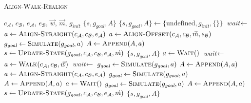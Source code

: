 \begin{algorithm}
	\caption{\scshape Align-Walk-Realign}
	\label{algo:local_algo}
	\begin{algorithmic}[1]
		\REQUIRE $c_\mathcal{A}$, $c_\mathcal{B}$, $e_\mathcal{A}$, $e_\mathcal{B}$, $\vec{w}$, $\vec{m}$, $g_\textit{init}$ 
		\ENSURE $\{s, g_\textit{goal}, A\}$ 
		\STATE $\{s, g_\textit{goal}, A\} \gets \{\text{undefined}, g_\textit{init}, \{\}\}$
		\STATE $\textit{wait} \gets$ \TRUE
		\LOOP
				\STATE $a \gets \text{\scshape Align-Straight}(c_\mathcal{A}, c_\mathcal{B}, e_\mathcal{A})$
			\ELSE
				\STATE $a \gets \text{\scshape Align-Offset}(c_\mathcal{A}, c_\mathcal{B}, \vec{m}, e_\mathcal{B})$
			\ENDIF
			\STATE $g_\textit{goal} \gets \text{\scshape Simulate}(g_\textit{goal}, a)$
			\STATE $A \gets \text{\scshape Append}(A, a)$
			\STATE $s \gets \text{\scshape Update-State}(g_\textit{goal}, c_\mathcal{A}, c_\mathcal{B}, e_\mathcal{A}, \vec{m})$
				\RETURN $\{s, g_\textit{goal}, A\}$
			\ENDIF
				\STATE $a \gets \text{\scshape Wait}()$
				\STATE $\textit{wait} \gets$ \FALSE
			\ELSE
				\STATE $a \gets \text{\scshape Walk}(c_\mathcal{A}, c_\mathcal{B}, \vec{w})$ 
				\STATE $\textit{wait} \gets$ \TRUE
			\ENDIF
			\STATE $g_\textit{goal} \gets \text{\scshape Simulate}(g_\textit{goal}, a)$
			\STATE $A \gets \text{\scshape Append}(A, a)$
				\STATE $a \gets \text{\scshape Align-Straight}(c_\mathcal{A}, c_\mathcal{B}, e_\mathcal{A})$ 
				\STATE $g_\textit{goal} \gets \text{\scshape Simulate}(g_\textit{goal}, a)$
				\STATE $A \gets \text{\scshape Append}(A, a)$
					\STATE $a \gets \text{\scshape Wait}()$
					\STATE $g_\textit{goal} \gets \text{\scshape Simulate}(g_\textit{goal}, a)$
					\STATE $A \gets \text{\scshape Append}(A, a)$
				\ENDWHILE
			\ENDIF
			\STATE $s \gets \text{\scshape Update-State}(g_\textit{goal}, c_\mathcal{A}, c_\mathcal{B}, e_\mathcal{A}, \vec{m})$
				\RETURN $\{s, g_\textit{goal}, A\}$
			\ENDIF
		\ENDLOOP 
	\end{algorithmic}
\end{algorithm}


